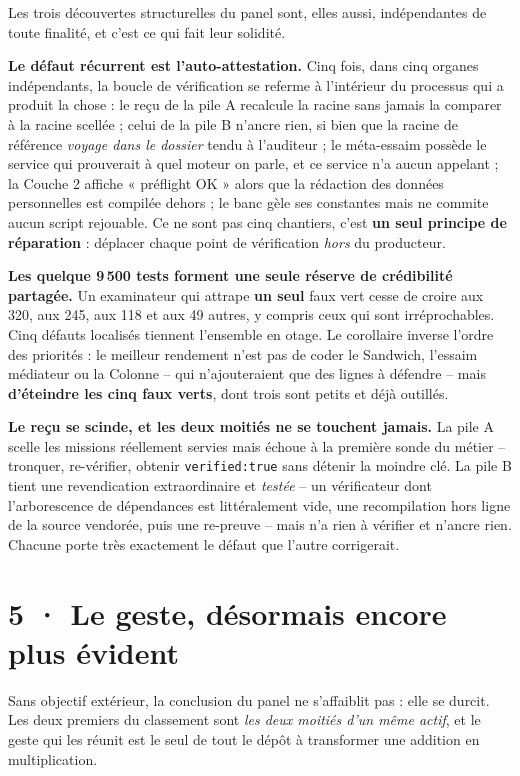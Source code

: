 \documentclass[10pt]{article}
\newcommand{\code}[1]{\texttt{\small #1}}
\begin{document}
Les trois découvertes structurelles du panel sont, elles aussi, indépendantes de toute finalité, et
c'est ce qui fait leur solidité.

\textbf{Le défaut récurrent est l'auto-attestation.} Cinq fois, dans cinq organes indépendants, la boucle
de vérification se referme à l'intérieur du processus qui a produit la chose : le reçu de la pile A
recalcule la racine sans jamais la comparer à la racine scellée ; celui de la pile B n'ancre rien, si
bien que la racine de référence \emph{voyage dans le dossier} tendu à l'auditeur ; le méta-essaim possède
le service qui prouverait à quel moteur on parle, et ce service n'a aucun appelant ; la Couche 2 affiche
« préflight OK » alors que la rédaction des données personnelles est compilée dehors ; le banc gèle ses
constantes mais ne commite aucun script rejouable. Ce ne sont pas cinq chantiers, c'est \textbf{un seul
principe de réparation} : déplacer chaque point de vérification \emph{hors} du producteur.

\textbf{Les quelque 9\,500 tests forment une seule réserve de crédibilité partagée.} Un examinateur qui
attrape \textbf{un seul} faux vert cesse de croire aux 320, aux 245, aux 118 et aux 49 autres, y compris
ceux qui sont irréprochables. Cinq défauts localisés tiennent l'ensemble en otage. Le corollaire inverse
l'ordre des priorités : le meilleur rendement n'est pas de coder le Sandwich, l'essaim médiateur ou la
Colonne -- qui n'ajouteraient que des lignes à défendre -- mais \textbf{d'éteindre les cinq faux verts},
dont trois sont petits et déjà outillés.

\textbf{Le reçu se scinde, et les deux moitiés ne se touchent jamais.} La pile A scelle les missions
réellement servies mais échoue à la première sonde du métier -- tronquer, re-vérifier, obtenir
\code{verified:true} sans détenir la moindre clé. La pile B tient une revendication extraordinaire et
\emph{testée} -- un vérificateur dont l'arborescence de dépendances est littéralement vide, une
recompilation hors ligne de la source vendorée, puis une re-preuve -- mais n'a rien à vérifier et n'ancre
rien. Chacune porte très exactement le défaut que l'autre corrigerait.

\section{5 · Le geste, désormais encore plus évident}

Sans objectif extérieur, la conclusion du panel ne s'affaiblit pas : elle se durcit. Les deux premiers du
classement sont \emph{les deux moitiés d'un même actif}, et le geste qui les réunit est le seul de tout
le dépôt à transformer une addition en multiplication.
\end{document}
